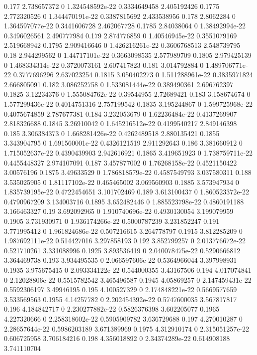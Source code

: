 {0.177 2.738657372 0 1.324548592e-22 0.3334649458 2.405192426
0.1775 2.772320526 0 1.344470191e-22 0.3387815692 2.433538956
0.178 2.8062284 0 1.364597077e-22 0.3441606728 2.462067728
0.1785 2.84038064 0 1.38492994e-22 0.3496026561 2.490777984
0.179 2.874776859 0 1.40546945e-22 0.3551079169 2.519668942
0.1795 2.909416646 0 1.426216261e-22 0.3606768513 2.548739795
0.18 2.944299562 0 1.44717101e-22 0.3663098535 2.577989709
0.1805 2.979425139 0 1.468334314e-22 0.3720073161 2.607417823
0.181 3.014792884 0 1.489706771e-22 0.3777696296 2.637023254
0.1815 3.050402273 0 1.511288961e-22 0.3835971824 2.666805091
0.182 3.086252758 0 1.533081444e-22 0.389490361 2.696762397
0.1825 3.12234376 0 1.555084762e-22 0.39544955 2.72689421
0.183 3.158674674 0 1.577299436e-22 0.4014751316 2.757199542
0.1835 3.195244867 0 1.599725968e-22 0.4075674859 2.787677381
0.184 3.232053679 0 1.62236484e-22 0.4137269907 2.818326688
0.1845 3.26910042 0 1.645216512e-22 0.4199540217 2.849146398
0.185 3.306384373 0 1.668281426e-22 0.4262489518 2.880135421
0.1855 3.343904795 0 1.691560001e-22 0.4326121519 2.911292643
0.186 3.381660912 0 1.715052637e-22 0.4390439903 2.942616921
0.1865 3.419651923 0 1.738759711e-22 0.4455448327 2.974107091
0.187 3.457877002 0 1.76268158e-22 0.4521150422 3.00576196
0.1875 3.49633529 0 1.786818579e-22 0.4587549793 3.037580311
0.188 3.535025905 0 1.81117102e-22 0.465465002 3.069560903
0.1885 3.573947934 0 1.835739195e-22 0.4722454651 3.101702469
0.189 3.613100437 0 1.860523372e-22 0.4790967209 3.134003716
0.1895 3.652482446 0 1.885523798e-22 0.4860191188 3.166463327
0.19 3.692092965 0 1.910740696e-22 0.4930130054 3.199079959
0.1905 3.731930971 0 1.936174266e-22 0.5000787239 3.231852247
0.191 3.771995412 0 1.961824686e-22 0.507216615 3.264778797
0.1915 3.812285209 0 1.987692111e-22 0.514427016 3.297858193
0.192 3.852799257 0 2.013776672e-22 0.521710261 3.331088996
0.1925 3.893536419 0 2.040078475e-22 0.5290666812 3.364469738
0.193 3.934495535 0 2.066597606e-22 0.5364966044 3.397998931
0.1935 3.975675415 0 2.093334122e-22 0.544000355 3.43167506
0.194 4.017074841 0 2.12028806e-22 0.5515782542 3.465496587
0.1945 4.05869257 0 2.147459431e-22 0.5592306197 3.49946195
0.195 4.100527329 0 2.174848221e-22 0.5669577659 3.533569563
0.1955 4.14257782 0 2.202454392e-22 0.5747600035 3.567817817
0.196 4.184842717 0 2.230277882e-22 0.5826376398 3.602205077
0.1965 4.227320666 0 2.258318602e-22 0.5905909782 3.636729688
0.197 4.270010287 0 2.28657644e-22 0.5986203189 3.671389969
0.1975 4.312910174 0 2.315051257e-22 0.606725958 3.706184216
0.198 4.356018892 0 2.34374289e-22 0.614908188 3.741110704
}
